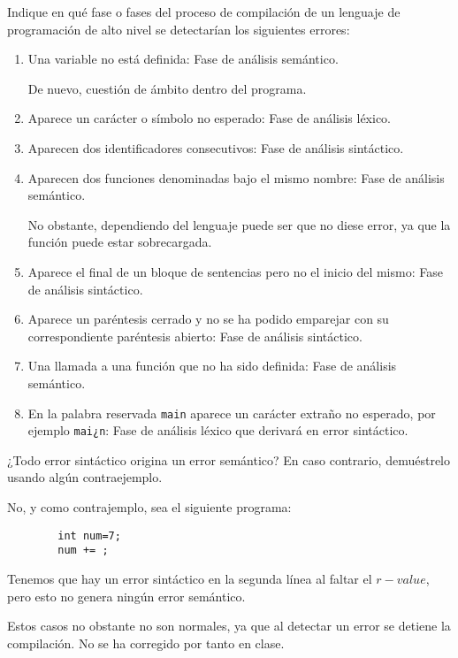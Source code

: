 \begin{ejercicio}\label{ej:3.Ejercicio15}
    Indique en qué fase o fases del proceso de compilación de un lenguaje de programación de alto nivel se detectarían los siguientes errores:
    \begin{enumerate}
        \item Una variable no está definida: Fase de análisis semántico.
        
        De nuevo, cuestión de ámbito dentro del programa.
        
        \item Aparece un carácter o símbolo no esperado: Fase de análisis léxico.

        \item Aparecen dos identificadores consecutivos: Fase de análisis sintáctico.

        \item Aparecen dos funciones denominadas bajo el mismo nombre: Fase de análisis semántico.
        
        No obstante, dependiendo del lenguaje puede ser que no diese error, ya que la función puede estar sobrecargada.

        \item Aparece el final de un bloque de sentencias pero no el inicio del mismo: Fase de análisis sintáctico.

        \item Aparece un paréntesis cerrado y no se ha podido emparejar con su correspondiente paréntesis abierto: Fase de análisis sintáctico.

        \item Una llamada a una función que no ha sido definida: Fase de análisis semántico.

        \item En la palabra reservada \verb|main| aparece un carácter extraño no esperado, por ejemplo \verb|mai¿n|: Fase de análisis léxico que derivará en error sintáctico. 
    \end{enumerate}
\end{ejercicio}

\begin{ejercicio}\label{ej:3.Ejercicio16}
    ¿Todo error sintáctico origina un error semántico? En caso contrario, demuéstrelo usando algún contraejemplo.

    No, y como contrajemplo, sea el siguiente programa:
    \begin{verbatim}
        int num=7;
        num += ;
    \end{verbatim}
    Tenemos que hay un error sintáctico en la segunda línea al faltar el $r-value$, pero esto no genera ningún error semántico.

    \begin{observacion}
        Estos casos no obstante no son normales, ya que al detectar un error se detiene la compilación. No se ha corregido por tanto en clase.
    \end{observacion}
\end{ejercicio}


